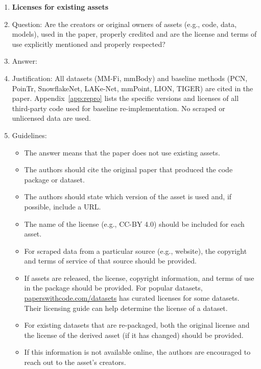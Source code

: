 \begin{enumerate}
\item {\bf Licenses for existing assets}
    \item[] Question: Are the creators or original owners of assets (e.g., code, data, models), used in the paper, properly credited and are the license and terms of use explicitly mentioned and properly respected?
    \item[] Answer: \answerYes{}
    \item[] Justification: All datasets (MM-Fi, mmBody) and baseline methods (PCN, PoinTr, SnowflakeNet, LAKe-Net, mmPoint, LION, TIGER) are cited in the paper. Appendix~\ref{app:repro} lists the specific versions and licenses of all third-party code used for baseline re-implementation. No scraped or unlicensed data are used.
    \item[] Guidelines:
    \begin{itemize}
        \item The answer \answerNA{} means that the paper does not use existing assets.
        \item The authors should cite the original paper that produced the code package or dataset.
        \item The authors should state which version of the asset is used and, if possible, include a URL.
        \item The name of the license (e.g., CC-BY 4.0) should be included for each asset.
        \item For scraped data from a particular source (e.g., website), the copyright and terms of service of that source should be provided.
        \item If assets are released, the license, copyright information, and terms of use in the package should be provided. For popular datasets, \url{paperswithcode.com/datasets} has curated licenses for some datasets. Their licensing guide can help determine the license of a dataset.
        \item For existing datasets that are re-packaged, both the original license and the license of the derived asset (if it has changed) should be provided.
        \item If this information is not available online, the authors are encouraged to reach out to the asset's creators.
    \end{itemize}


\end{enumerate}
